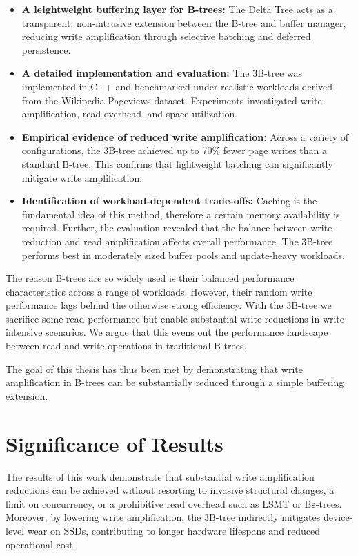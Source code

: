 \begin{itemize}
    \item \textbf{A leightweight buffering layer for B-trees:}  
    The Delta Tree acts as a transparent, non-intrusive extension between the B-tree and buffer manager, reducing write amplification through selective batching and deferred persistence.

    \item \textbf{A detailed implementation and evaluation:}  
    The 3B-tree was implemented in C++ and benchmarked under realistic workloads derived from the Wikipedia Pageviews dataset. 
    Experiments investigated write amplification, read overhead, and space utilization.

    \item \textbf{Empirical evidence of reduced write amplification:}  
    Across a variety of configurations, the 3B-tree achieved up to 70\% fewer page writes than a standard B-tree. This confirms that lightweight batching can significantly mitigate write amplification. 

    \item \textbf{Identification of workload-dependent trade-offs:}  
    Caching is the fundamental idea of this method, therefore a certain memory availability is required.
    Further, the evaluation revealed that the balance between write reduction and read amplification affects overall performance.
    The 3B-tree performs best in moderately sized buffer pools and update-heavy workloads.
\end{itemize}

The reason B-trees are so widely used is their balanced performance characteristics across a range of workloads.
However, their random write performance lags behind the otherwise strong efficiency.
With the 3B-tree we sacrifice some read performance but enable substantial write reductions in write-intensive scenarios.
We argue that this evens out the performance landscape between read and write operations in traditional B-trees.

The goal of this thesis has thus been met by demonstrating that write amplification in B-trees can be substantially reduced through a simple buffering extension.

\section{Significance of Results}
The results of this work demonstrate that substantial write amplification reductions can be achieved without resorting to invasive structural changes, a limit on concurrency, or a prohibitive read overhead such as \ac{LSMT} or B$\varepsilon$-trees.
Moreover, by lowering write amplification, the 3B-tree indirectly mitigates device-level wear on SSDs, contributing to longer hardware lifespans and reduced operational cost. 

